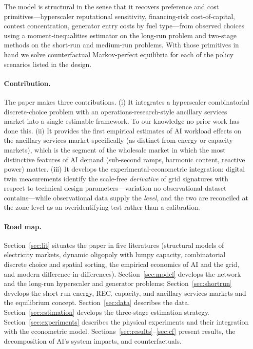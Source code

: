 \documentclass[12pt,letterpaper]{article}
\begin{document}
The model is structural in the sense that it recovers preference and cost
primitives---hyperscaler reputational sensitivity, financing-risk cost-of-capital,
contest concentration, generator entry costs by fuel type---from observed
choices using a moment-inequalities estimator on the long-run problem and
two-stage methods on the short-run and medium-run problems. With those
primitives in hand we solve counterfactual Markov-perfect equilibria for
each of the policy scenarios listed in the design.

\paragraph{Contribution.} The paper makes three contributions. (i) It
integrates a hyperscaler combinatorial discrete-choice problem with an
operations-research-style ancillary services market into a single estimable
framework. To our knowledge no prior work has done this. (ii) It provides
the first empirical estimates of AI workload effects on the ancillary
services market specifically (as distinct from energy or capacity markets),
which is the segment of the wholesale market in which the most distinctive
features of AI demand (sub-second ramps, harmonic content, reactive power)
matter. (iii) It develops the experimental-econometric integration: digital
twin measurements identify the scale-free \emph{derivative} of grid signatures
with respect to technical design parameters---variation no observational
dataset contains---while observational data supply the \emph{level}, and the
two are reconciled at the zone level as an overidentifying test rather than a
calibration.

\paragraph{Road map.} Section~\ref{sec:lit} situates the paper in five
literatures (structural models of electricity markets, dynamic oligopoly with
lumpy capacity, combinatorial discrete choice and spatial sorting, the
empirical economics of AI and the grid, and modern difference-in-differences).
Section~\ref{sec:model} develops the network and the long-run hyperscaler and
generator problems; Section~\ref{sec:shortrun} develops the short-run
energy, REC, capacity, and ancillary-services markets and the equilibrium
concept. Section~\ref{sec:data} describes the data. Section~\ref{sec:estimation}
develops the three-stage estimation strategy. Section~\ref{sec:experiments}
describes the physical experiments and their integration with the
econometric model. Sections~\ref{sec:results}--\ref{sec:cf} present results,
the decomposition of AI's system impacts, and counterfactuals.
\end{document}

